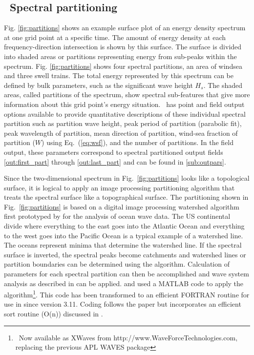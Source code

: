 \vssub
\subsection{~Spectral partitioning} \label{sub:num_part}

\noindent
Fig. \ref{fig:partitions} shows an example surface plot of an energy density
spectrum at one grid point at a specific time.  The amount of energy density
at each frequency-direction intersection is shown by this surface.  The
surface is divided into shaded areas or partitions representing energy from
sub-peaks within the spectrum.  Fig. \ref{fig:partitions} shows four
spectral partitions, an area of windsea and three swell trains.  The total
energy represented by this spectrum can be defined by bulk parameters, such as
the significant wave height $H_s$. The shaded areas, called partitions of the
spectrum, show spectral sub-features that give more information about this
grid point's energy situation.  \ws\ has point and field output options
available to provide quantitative descriptions of these individual spectral
partition such as partition wave height, peak period of partition (parabolic
fit), peak wavelength of partition, mean direction of partition, wind-sea
fraction of partition ($W$) using Eq.~(\ref{eq:wsf}), and the number of
partitions.  In the field output, these parameters correspond to spectral partitioned output fields 
\ref{out:first_part} through \ref{out:last_part} and can be found in
\para\ref{sub:outpars}.

Since the two-dimensional spectrum in Fig.~\ref{fig:partitions} looks like a
topological surface, it is logical to apply an image processing partitioning
algorithm that treats the spectral surface like a topographical surface.  The
partitioning shown in Fig.~\ref{fig:partitions} is based on a digital image
processing watershed algorithm \citep{art:VS91} first prototyped by
\cite{pro:HJ04} for the analysis of ocean wave data. 
The US continental divide where everything to the east goes into the Atlantic
Ocean and everything to the west goes into the Pacific Ocean is a typical
example of a watershed line.  The oceans represent minima that determine the
watershed line.  If the spectral surface is inverted, the spectral peaks
become catchments and watershed lines or partition boundaries can be
determined using the \cite{art:VS91} algorithm.  Calculation of parameters for
each spectral partition can then be accomplished and wave system analysis as
described in \cite{art:HP01} can be applied.  \cite{pro:HJ04} and
\cite{tol:Vict06b} used a MATLAB code to apply the \cite{art:VS91}
algorithm\footnote{~Now available as XWaves from
http://www.WaveForceTechnologies.com, replacing the previous APL WAVES
package}.  This code has been transformed to an efficient FORTRAN routine for
use in \ws since version 3.11.  Coding follows the
\cite{art:VS91} paper but incorporates an efficient sort routine (O(n))
discussed in \cite{rep:TTH06}.

